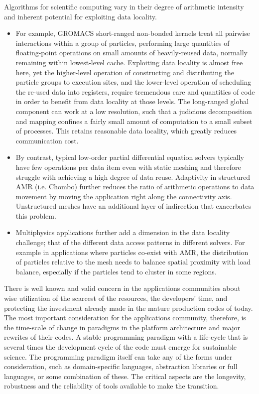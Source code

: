 Algorithms for scientific computing vary in their degree of
arithmetic intensity and inherent potential for exploiting data locality.
\begin{itemize}
\item For example, GROMACS short-ranged non-bonded kernels treat
all pairwise interactions within a group of particles, performing
large quantities of floating-point operations on small amounts of
heavily-reused data, normally remaining within lowest-level cache.
Exploiting data locality is almost free here, yet the higher-level
operation of constructing and distributing the particle groups
to execution sites, and the lower-level operation of scheduling
the re-used data into registers, require tremendous care and
quantities of code in order to benefit from data locality at those
levels.
The long-ranged global component can work at a low resolution,
such that a judicious decomposition and mapping confines
a fairly small amount of computation to a small subset
of processes. This retains reasonable data locality, which
greatly reduces communication cost.
\item By contrast, typical low-order partial differential equation
  solvers typically   have few operations per data item even with
  static meshing and therefore struggle with achieving a high degree
  of data reuse. Adaptivity in structured AMR (i.e. Chombo) further
  reduces the ratio of arithmetic operations to data movement by
  moving the application right along the connectivity
  axis. Unstructured meshes have an additional   layer of indirection
  that exacerbates this problem.
\item Multiphysics applications further add a
  dimension  in  the data locality challenge; that of the 
different data access patterns in different solvers. For example in
applications where particles co-exist with AMR, the distribution of
particles relative to the mesh needs to balance spatial proximity with
load balance, especially if the particles tend to cluster in some
regions. 
\end{itemize}

There is well known
and valid concern in the applications communities about wise
utilization of the scarcest of the resources, the developers' time, and
protecting the investment already made in the mature production codes
of today. The most important consideration for the applications
community, therefore, is the time-scale of change in paradigms in the
platform architecture and major rewrites of their codes. A stable
programming paradigm with a life-cycle that is several times the
development cycle of the code must emerge for sustainable science. The
programming paradigm itself can take any of the forms under
consideration, such as domain-specific languages, abstraction
libraries or full languages, or some combination of these. The
critical aspects are the longevity, robustness and the reliability of
tools available to make the transition. 
 
